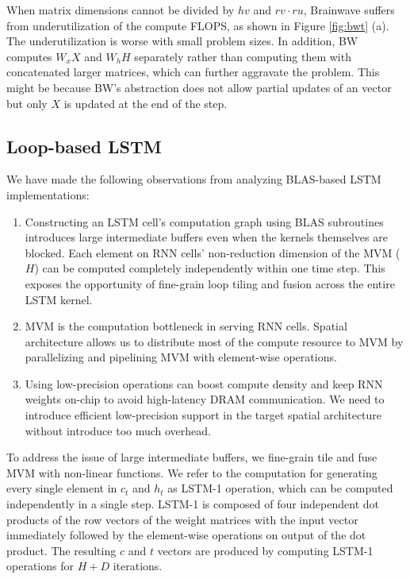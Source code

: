 When matrix dimensions cannot be divided by $hv$ and $rv\cdot ru$, Brainwave suffers from
underutilization of the compute FLOPS, as shown in Figure \ref{fig:bwt} (a).
The underutilization is worse with small problem sizes.
In addition, BW computes $W_xX$ and $W_hH$ separately rather than computing them with concatenated larger matrices,
  which can further aggravate the problem.
This might be because BW's abstraction does not allow partial updates of an vector
  but only $X$ is updated at the end of the step.


\subsection{Loop-based LSTM}
We have made the following observations
  from analyzing BLAS-based LSTM implementations:
\begin{enumerate}
\item 
  Constructing an LSTM cell's computation graph using BLAS subroutines
  introduces large intermediate buffers even when the kernels themselves are blocked.
  Each element on RNN cells' non-reduction dimension of the MVM ($H$)
  can be computed completely independently within one time step. This
  exposes the opportunity of fine-grain loop tiling and fusion across the
  entire LSTM kernel. 
\item MVM is the computation bottleneck in serving RNN cells. Spatial
  architecture allows us to distribute most of the compute resource to MVM 
  by parallelizing and pipelining MVM with element-wise operations.
\item Using low-precision operations can boost compute density and keep RNN
  weights on-chip to avoid high-latency DRAM communication. We need to introduce
  efficient low-precision support in the target spatial architecture without introduce
  too much overhead.
\end{enumerate}

To address the issue of large intermediate buffers, we fine-grain tile and fuse
MVM with non-linear functions. We refer to the computation for generating 
every single element in $c_t$ and $h_t$ as LSTM-1 operation, which can be computed
independently in a single step. LSTM-1 is composed of four independent dot products of 
the row vectors of the weight matrices with the input vector immediately followed by the 
element-wise operations on output of the dot product. The resulting $c$ and $t$ vectors are 
produced by computing LSTM-1 operations for $H+D$ iterations.

